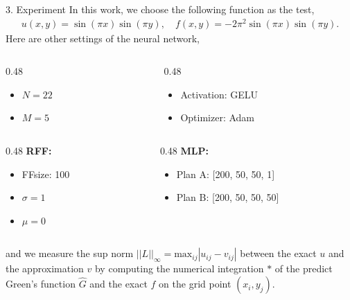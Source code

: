 \begin{frame}{3. Experiment}
    In this work, we choose the following function as the test,
    \begin{align}
        u(x,y)=\sin{(\pi x)}\sin{(\pi y)}, \quad f(x,y)=-2\pi^2\sin{(\pi x)}\sin{(\pi y)}.
    \end{align}
    Here are other settings of the neural network,
    \begin{columns}
        \begin{column}{0.48\textwidth}
            \begin{itemize}
                \item $N = 22$
                \item $M = 5$
            \end{itemize}
        \end{column}
        
        \begin{column}{0.48\textwidth}
            \begin{itemize}
                \item Activation: GELU
                \item Optimizer: Adam
            \end{itemize}
        \end{column}
    \end{columns}
    \vspace{1em}
    \begin{columns}[t]
        \begin{column}{0.48\textwidth}
            \textbf{RFF:}
            \begin{itemize}
                \item FFsize: 100
                \item $\sigma = 1$
                \item $\mu = 0$ 
            \end{itemize}
        \end{column}
        
        \begin{column}{0.48\textwidth}
            \textbf{MLP:}
            \begin{itemize}
                \item Plan A: [200, 50, 50, 1]
                \item Plan B: [200, 50, 50, 50]
            \end{itemize}
        \end{column}
    \end{columns}
    
    \vspace{1em}
    and we measure the sup norm $||L||_\infty = \text{max}_{ij}|u_{ij}-v_{ij}|$ between the exact $u$ and the approximation $v$
     by computing the numerical integration $*$ of the predict Green's function $\hat{G}$ and the exact $f$ on the grid point $(x_i,y_j)$.

\end{frame}

